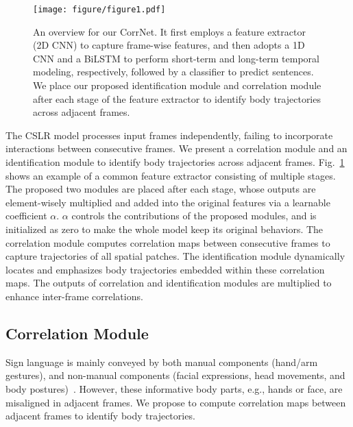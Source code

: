 \documentclass[10pt,twocolumn,letterpaper]{article}
\begin{document}
\begin{figure}[t]
  \centering
  \texttt{[image: figure/figure1.pdf]}
  \caption{An overview for our CorrNet. It first employs a feature extractor (2D CNN) to capture frame-wise features, and then adopts a 1D CNN and a BiLSTM to perform short-term and long-term temporal modeling, respectively, followed by a classifier to predict sentences. We place our proposed identification module and correlation module after each stage of the feature extractor to identify body trajectories across adjacent frames.}
  \label{fig1}
  \end{figure}

The CSLR model processes input frames independently, failing to incorporate interactions between consecutive frames. We present a correlation module and an identification module to identify body trajectories across adjacent frames. Fig.~\ref{fig1} shows an example of a common feature extractor consisting of multiple stages. The proposed two modules are placed after each stage, whose outputs are element-wisely multiplied and added into the original features via a learnable coefficient $\alpha$. $\alpha$ controls the contributions of the proposed modules, and is initialized as zero to make the whole model keep its original behaviors. The correlation module computes correlation maps between consecutive frames to capture trajectories of all spatial patches. The identification module dynamically locates and emphasizes body trajectories embedded within these correlation maps. The outputs of correlation and identification modules are
multiplied to enhance inter-frame correlations.

\subsection{Correlation Module}
Sign language is mainly conveyed by both manual components (hand/arm gestures), and non-manual components (facial expressions, head movements, and body postures)~\cite{dreuw2007speech,ong2005automatic}. However, these informative body parts, e.g., hands or face, are misaligned in adjacent frames. We propose to compute correlation maps between adjacent frames to identify body trajectories. 
\end{document}
